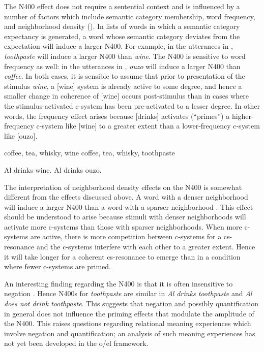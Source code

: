 The N400 effect does not require a sentential context and is influenced by a number of factors which include semantic category membership, word frequency, and neighborhood density (\citealt{KutasFedermeier2011,LauEtAl2008}). In lists of words in which a semantic category expectancy is generated, a word whose semantic category deviates from the expectation will induce a larger N400. For example, in the utterances in , \textit{toothpaste} will induce a larger N400 than \textit{wine}. The N400 is sensitive to word frequency as well: in the utterances in , \textit{ouzo} will induce a larger N400 than \textit{coffee}. In both cases, it is sensible to assume that prior to presentation of the stimulus \textit{wine}, a [wine] system is already active to some degree, and hence a smaller change in coherence of [wine] occurs post-stimulus than in cases where the stimulus-activated c-system has been pre-activated to a lesser degree. In other words, the frequency effect arises because [drinks] activates (“primes”) a higher-frequency c-system like [wine] to a greater extent than a lower-frequency c-system like [ouzo].

\ea\label{ex:6:25}
\ea\label{ex:6:25a} coffee, tea, whisky, wine
\ex\label{ex:6:25b}  coffee, tea, whisky, toothpaste
\z
\z

\ea\label{ex:6:26}
\ea\label{ex:6:26a} Al drinks wine.
\ex\label{ex:6:26b} Al drinks ouzo.
\z
\z

  The interpretation of neighborhood density effects on the N400 is somewhat different from the effects discussed above. A word with a denser neighborhood will induce a larger N400 than a word with a sparser neighborhood \citep{HolcombEtAl2002,MüllerEtAl2010}. This effect should be understood to arise because stimuli with denser neighborhoods will activate more c-systems than those with sparser neighborhoods. When more c-systems are active, there is more competition between c-systems for a cs-resonance and the c-systems interfere with each other to a greater extent. Hence it will take longer for a coherent cs-resonance to emerge than in a condition where fewer c-systems are primed. 

  An interesting finding regarding the N400 is that it is often insensitive to negation \citep{KutasFedermeier2011}. Hence N400s for \textit{toothpaste} are similar in \textit{Al drinks toothpaste} and \textit{Al does not drink toothpaste}. This suggests that negation and possibly quantification in general does not influence the priming effects that modulate the amplitude of the N400. This raises questions regarding relational meaning experiences which involve negation and quantification; an analysis of such meaning experiences has not yet been developed in the o/el framework.

